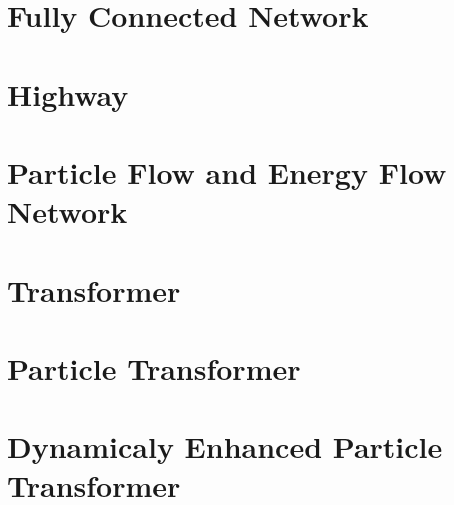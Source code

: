 \section{Fully Connected Network}
\label{sec:fc}

\section{Highway}
\label{sec:highway}

\section{Particle Flow and Energy Flow Network}
\label{sec:pfn_efn}

\section{Transformer}
\label{sec:transformer}

\section{Particle Transformer}
\label{sec:part}

\section{Dynamicaly Enhanced Particle Transformer}
\label{sec:depart}


